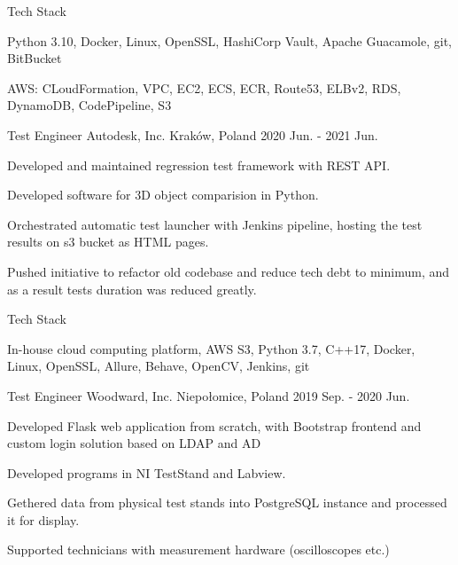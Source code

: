 \begin{cventries}
  \cventry
    {Tech Stack} %
    {}
    {}
    {}
    {
      \begin{cvitems}
        \item {Python 3.10, Docker, Linux, OpenSSL, HashiCorp Vault, Apache Guacamole, git, BitBucket}
        \item {AWS: CLoudFormation, VPC, EC2, ECS, ECR, Route53, ELBv2, RDS, DynamoDB, CodePipeline, S3}
      \end{cvitems}
    }


  \cventry
    {Test Engineer} %
    {Autodesk, Inc.} %
    {Kraków, Poland} %
    {2020 Jun. - 2021 Jun.} %
    {
      \begin{cvitems} %
        \item {Developed and maintained regression test framework with REST API.}
        \item {Developed software for 3D object comparision in Python.}
        \item {Orchestrated automatic test launcher with Jenkins pipeline, hosting the test results on s3 bucket as HTML pages.}
        \item {Pushed initiative to refactor old codebase and reduce tech debt to minimum, and as a result tests duration was reduced greatly.}
      \end{cvitems}
    }

  \cventry
    {Tech Stack} %
    {}
    {}
    {}
    {
      \begin{cvitems}
        \item {In-house cloud computing platform, AWS S3, Python 3.7, C++17, Docker, Linux, OpenSSL, Allure, Behave, OpenCV, Jenkins, git}
      \end{cvitems}
    }

  \cventry
    {Test Engineer} %
    {Woodward, Inc.} %
    {Niepołomice, Poland} %
    {2019 Sep. - 2020 Jun.} %
    {
      \begin{cvitems} %
        \item {Developed Flask web application from scratch, with Bootstrap frontend and custom login solution based on LDAP and AD}
        \item {Developed programs in NI TestStand and Labview.}
        \item {Gethered data from physical test stands into PostgreSQL instance and processed it for display.}
        \item {Supported technicians with measurement hardware (oscilloscopes etc.)}
      \end{cvitems}
    }


\end{cventries}
